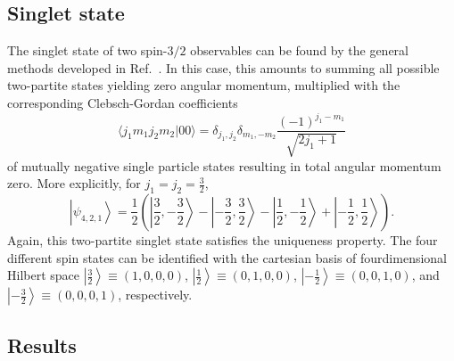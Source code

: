 \documentclass[pra,amsfonts,showpacs,showkeys,preprint]{revtex4}
\begin{document}
\subsection{Singlet state}

The singlet state of two spin-$3/2$ observables
can be found by the general methods developed in Ref.~\cite{schimpf-svozil}.
In this case, this amounts to summing all possible two-partite states yielding zero angular momentum,
multiplied with the corresponding  Clebsch-Gordan coefficients
\begin{equation}
\langle j_1m_1j_2m_2\vert 00\rangle = \delta_{j_1,j_2}  \delta_{m_1,-m_2} \frac{(-1)^{j_1-m_1}}{\sqrt{2j_1+1}}
\label{2009-gtq-cgordon0}
\end{equation}
of mutually negative single particle states resulting in total angular momentum zero.
More explicitly,  for $j_1=j_2=\frac{3}{2}$,
\begin{equation}
\left|  \left. \psi_{4,2,1} \right\rangle  \right. =
\frac{1}{2} \left(
\left| \left. \frac{3}{2}, -\frac{3}{2}\right\rangle \right.
 - \left| \left.  -\frac{3}{2}, \frac{3}{2}\right\rangle    \right.
- \left| \left.  \frac{1}{2}, -\frac{1}{2}\right\rangle  \right.
+ \left| \left.  -\frac{1}{2}, \frac{1}{2}\right\rangle   \right.
\right).
\end{equation}
Again, this two-partite singlet state satisfies the uniqueness property.
The four different spin states can be identified with the cartesian basis of fourdimensional Hilbert space
$\left| \left. \frac{3}{2}\right\rangle \right. \equiv (1,0,0,0)$,
$\left| \left. \frac{1}{2}\right\rangle \right. \equiv (0,1,0,0)$,
$\left| \left. -\frac{1}{2}\right\rangle \right. \equiv (0,0,1,0)$,
and
$\left| \left. -\frac{3}{2}\right\rangle \right. \equiv (0,0,0,1)$,
respectively.

\subsection{Results}
\end{document}
